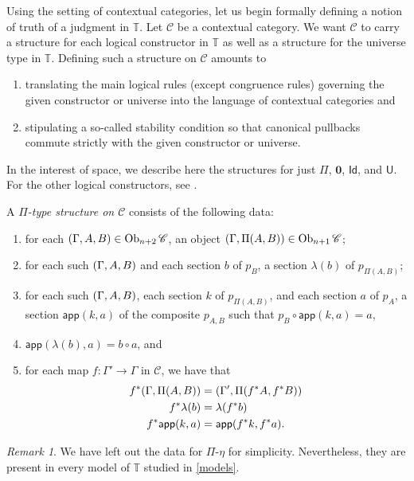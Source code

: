 \documentclass[10pt,letterpaper,cm]{nupset}
\theoremstyle{definition}
\theoremstyle{theorem}
\theoremstyle{remark}
\newtheorem{remark}[definition]{Remark}
\DeclareMathOperator{\ob}{Ob}
\newcommand{\id}{\mathsf{Id}}
\newcommand{\app}{\mathsf{app}}
\newcommand{\U}{\mathsf{U}}
\newcommand{\0}{\mathbf{0}}
\newcommand{\1}{\mathbf{1}}
\newcommand{\2}{\mathbf{2}}
\renewcommand{\c}{\mathscr{C}}
\newcommand{\T}{\mathbb T}
\newcommand{\be}{\begin{enumerate}}
\newcommand{\ee}{\end{enumerate}}
\begin{document}
\smallskip

Using the setting of contextual categories, let us begin formally defining a notion of truth of a judgment in $\T$. Let $\c$ be a contextual category. We want $\c$ to carry a structure for each logical constructor in $\T$ as well as a structure for the universe type in $\T$. Defining such a structure on $\c$ amounts to 
\be[label=(\alph*)] 
\item translating the main logical rules (except congruence rules) governing the given constructor or universe into the language of contextual categories and
\item stipulating a so-called stability condition so that  canonical pullbacks commute strictly with the given constructor or universe.
\ee In the interest of space, we describe here the structures for just $\Pi$, $\0$, $\id$, and $\U$. For the other logical constructors, see \cite[Appendix B]{KL}.  

\medskip

A \textit{$\Pi$-type structure on $\c$} consists of the following data:\label{pitype}
\be[label=(\roman*)]
\item for each $\mleft(\Gamma, A, B\mright) \in \ob_{n+2}{\c}$, an object $\mleft(\Gamma, \Pi(A, B)\mright)\in \ob_{n+1}{\c}$;  
\item for each such $\mleft(\Gamma, A, B\mright)$ and each section $b$ of $p_B$, a section $\lambda(b)$ of $p_{\Pi(A, B)}$;
\item for each such $\mleft(\Gamma, A, B\mright)$, each section $k$ of $p_{ \Pi(A, B)}$, and each section $a$ of $p_A$, a section $\app(k,a)$ of the composite $p_{A,B}$ such that $p_B \circ \app(k,a)=a$,
\item $\app(\lambda(b), a)=b\circ a$, and
\item for each map $f: \Gamma' \to \Gamma$ in $\c$, we have that
\begin{align*}
f^{\ast}(\Gamma, \Pi(A,B)) & = \mleft(\Gamma', \Pi(f^{\ast}{A}, f^{\ast}{B})\mright)
\\ f^{\ast}\lambda(b) & = \lambda(f^{\ast}{b})
\\ f^{\ast}\app(k,a) & = \app(f^{\ast}{k}, f^{\ast}{a}).
\end{align*}
\ee

\begin{remark}
We have left out the data for $\Pi$-$\eta$ for simplicity. Nevertheless, they are present in every model of $\T$ studied in \cref{models}.
\end{remark}
\end{document}
